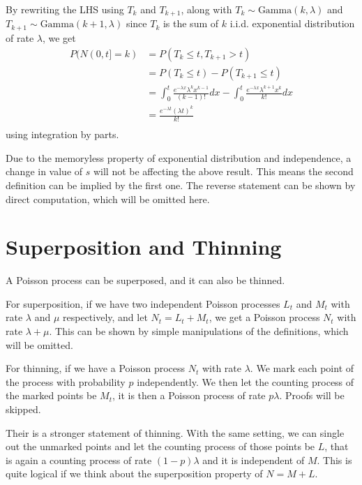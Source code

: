 \documentclass[11pt, a4paper, oneside]{book}
\theoremstyle{definition}
\newcommand{\gammad}[2]{\text{Gamma}(#1, #2)}
\begin{document}
\noindent By rewriting the LHS using $T_k$ and $T_{k+1}$, along with $T_k \sim \gammad{k}{\lambda}$ and $T_{k+1} \sim \gammad{k+1}{\lambda}$ since $T_k$ is the sum of $k$ i.i.d. exponential distribution of rate $\lambda$, we get
\begin{equation*}
\begin{split}
P(N(0,t] = k) &= P(T_k \le t, T_{k+1} > t) \\
&= P(T_k \le t) - P(T_{k+1} \le t) \\
&= \int_0^t \frac{e^{-\lambda x}{\lambda}^k x^{k-1}}{(k-1)!} dx - \int_0^t \frac{e^{-\lambda x}{\lambda}^{k+1} x^{k}}{k!} dx \\ 
&= \frac{e^{-\lambda t}(\lambda t)^k}{k!} \\ 
\end{split}
\end{equation*}
using integration by parts. 

\noindent Due to the memoryless property of exponential distribution and independence, a change in value of $s$ will not be affecting the above result. This means the second definition can be implied by the first one. The reverse statement can be shown by direct computation, which will be omitted here. 

\section{Superposition and Thinning} 

\noindent A Poisson process can be superposed, and it can also be thinned. 

\noindent For superposition, if we have two independent Poisson processes $L_t$ and $M_t$ with rate $\lambda$ and $\mu$ respectively, and let $N_t = L_t + M_t$, we get a Poisson process $N_t$ with rate $\lambda + \mu$. This can be shown by simple manipulations of the definitions, which will be omitted. 

\noindent For thinning, if we have a Poisson process $N_t$ with rate $\lambda$. We mark each point of the process with probability $p$ independently. We then let the counting process of the marked points be $M_t$, it is then a Poisson process of rate $p\lambda$. Proofs will be skipped. 

\noindent Their is a stronger statement of thinning. With the same setting, we can single out the unmarked points and let the counting process of those points be $L$, that is again a counting process of rate $(1-p)\lambda$ and it is independent of $M$. This is quite logical if we think about the superposition property of $N = M + L$. 
\end{document}
